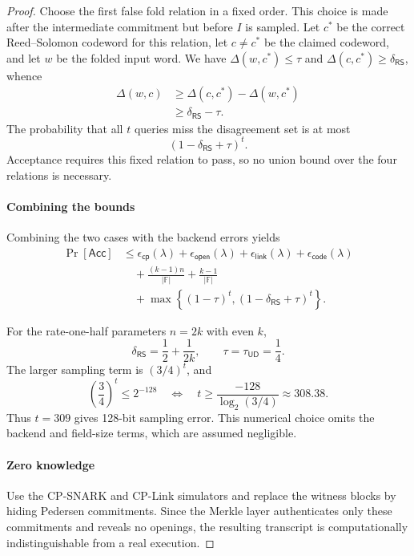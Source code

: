 \documentclass[conference,compsoc]{IEEEtran}
\newif\ifshowrevisions
\newenvironment{revblock}[1][]
  {%
    \ifshowrevisions
      \begin{tcolorbox}[
        breakable,
        colback=revisionyellow,
        colframe=revisionyellow,
        boxrule=0pt,
        arc=0pt,
        left=2pt,
        right=2pt,
        top=2pt,
        bottom=2pt,
        before skip=2pt,
        after skip=2pt,
        #1
      ]
    \fi
  }
  {%
    \ifshowrevisions
      \end{tcolorbox}
    \fi
  }
\theoremstyle{plain}
\theoremstyle{definition}
\theoremstyle{remark}
\begin{document}
\begin{revblock}
\begin{proof}
Choose the first false fold relation in a fixed order.  This choice is made
after the intermediate commitment but before \(I\) is sampled.  Let \(c^*\)
be the correct Reed--Solomon codeword for this relation, let \(c\ne c^*\) be
the claimed codeword, and let \(w\) be the folded input word.  We have
\(\Delta(w,c^*)\le\tau\) and
\(\Delta(c,c^*)\ge\delta_{\mathsf{RS}}\), whence
\[
\begin{aligned}
 \Delta(w,c)
 &\ge \Delta(c,c^*)-\Delta(w,c^*)\\
 &\ge \delta_{\mathsf{RS}}-\tau.
\end{aligned}
\]
The probability that all \(t\) queries miss the disagreement set is at most
\[
 (1-\delta_{\mathsf{RS}}+\tau)^t.
\]
Acceptance requires this fixed relation to pass, so no union bound over the
four relations is necessary.

\paragraph{Combining the bounds}
Combining the two cases with the backend errors yields
\[
\begin{aligned}
\Pr[\mathsf{Acc}]
&\le
 \epsilon_{\mathsf{cp}}(\lambda)
 +\epsilon_{\mathsf{open}}(\lambda)
 +\epsilon_{\mathsf{link}}(\lambda)
 +\epsilon_{\mathsf{code}}(\lambda)\\
&\quad
 +\frac{(k-1)n}{|\mathbb F|}
 +\frac{k-1}{|\mathbb F|}\\
&\quad
 +\max\!\left\{
   (1-\tau)^t,
   (1-\delta_{\mathsf{RS}}+\tau)^t
 \right\}.
\end{aligned}
\]

For the rate-one-half parameters \(n=2k\) with even \(k\),
\[
 \delta_{\mathsf{RS}}=\frac{1}{2}+\frac{1}{2k},
 \qquad \tau=\tau_{\mathsf{UD}}=\frac{1}{4}.
\]
The larger sampling term is \((3/4)^t\), and
\[
 \left(\frac{3}{4}\right)^t\le2^{-128}
 \quad\Longleftrightarrow\quad
 t\ge\frac{-128}{\log_2(3/4)}\approx308.38.
\]
Thus \(t=309\) gives 128-bit sampling error.  This numerical choice omits the
backend and field-size terms, which are assumed negligible.

\paragraph{Zero knowledge}
Use the CP-SNARK and CP-Link simulators and replace the witness blocks by hiding
Pedersen commitments.  Since the Merkle layer authenticates only these
commitments and reveals no openings, the resulting transcript is
computationally indistinguishable from a real execution.
\end{proof}
\end{revblock}
\end{document}

